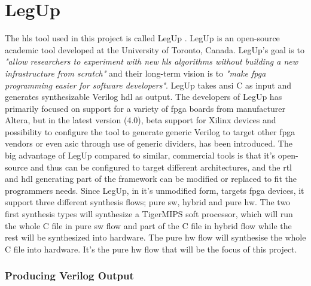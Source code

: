 \section{LegUp}
The \gls{hls} tool used in this project is called LegUp \cite{canis2011legup}. LegUp is an open-source academic tool developed at the University of Toronto, Canada. LegUp's goal is to \textit{"allow researchers to experiment with new \gls{hls} algorithms without building a new infrastructure from scratch"} and their long-term vision is to \textit{"make \gls{fpga} programming easier for software developers"}. LegUp takes \acrshort{ansi} C as input and generates synthesizable Verilog \gls{hdl} as output. The developers of LegUp has primarily focused on support for a variety of \gls{fpga} boards from manufacturer Altera, but in the latest version (4.0), beta support for Xilinx devices and possibility to configure the tool to generate generic Verilog to target other \gls{fpga} vendors or even \gls{asic} through use of generic dividers, has been introduced. The big advantage of LegUp compared to similar, commercial tools is that it's open-source and thus can be configured to target different architectures, and the \gls{rtl} and \gls{hdl} generating part of the framework can be modified or replaced to fit the programmers needs.
Since LegUp, in it's unmodified form, targets \gls{fpga} devices, it support three different synthesis flows; pure \gls{sw}, hybrid and pure \gls{hw}. The two first synthesis types will synthesize a TigerMIPS \cite{tigmips} soft processor, which will run the whole C file in pure \gls{sw} flow and part of the C file in hybrid flow while the rest will be synthesized into hardware. The pure \gls{hw} flow will synthesise the whole C file into hardware. It's the pure \gls{hw} flow that will be the focus of this project.

\subsubsection{Producing Verilog Output}

